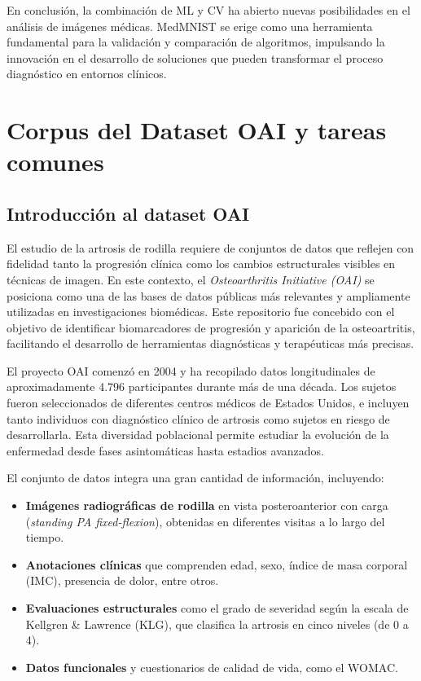 \documentclass[11pt,spanish,listoffigures,listoftables]{tfgetsinf}
\begin{document}
En conclusión, la combinación de ML y CV ha abierto nuevas posibilidades en el análisis de imágenes médicas. MedMNIST se erige como una herramienta fundamental para la validación y comparación de algoritmos, impulsando la innovación en el desarrollo de soluciones que pueden transformar el proceso diagnóstico en entornos clínicos.




\chapter{Corpus del Dataset OAI y tareas comunes}
\label{chap:corpus}

\section{Introducción al dataset OAI}

El estudio de la artrosis de rodilla requiere de conjuntos de datos que reflejen con fidelidad tanto la progresión clínica 
como los cambios estructurales visibles en técnicas de imagen. En este contexto, el \textit{Osteoarthritis Initiative (OAI)}\cite{chen2018knee}
se posiciona como una de las bases de datos públicas más relevantes y ampliamente utilizadas en investigaciones biomédicas. 
Este repositorio fue concebido con el objetivo de identificar biomarcadores de progresión y aparición de la osteoartritis, 
facilitando el desarrollo de herramientas diagnósticas y terapéuticas más precisas.

El proyecto OAI comenzó en 2004 y ha recopilado datos longitudinales de aproximadamente 4.796 participantes durante más de una 
década. Los sujetos fueron seleccionados de diferentes centros médicos de Estados Unidos, e incluyen tanto individuos con 
diagnóstico clínico de artrosis como sujetos en riesgo de desarrollarla. Esta diversidad poblacional permite estudiar la 
evolución de la enfermedad desde fases asintomáticas hasta estadios avanzados.

El conjunto de datos integra una gran cantidad de información, incluyendo:

\begin{itemize}
    \item \textbf{Imágenes radiográficas de rodilla} en vista posteroanterior con carga (\textit{standing PA fixed-flexion}), obtenidas en diferentes visitas a lo largo del tiempo.
    \item \textbf{Anotaciones clínicas} que comprenden edad, sexo, índice de masa corporal (IMC), presencia de dolor, entre otros.
    \item \textbf{Evaluaciones estructurales} como el grado de severidad según la escala de Kellgren \& Lawrence (KLG), que clasifica la artrosis en cinco niveles (de 0 a 4).
    \item \textbf{Datos funcionales} y cuestionarios de calidad de vida, como el WOMAC.
\end{itemize}
\end{document}
